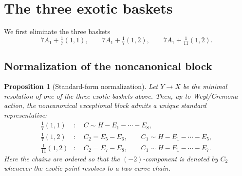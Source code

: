 \documentclass[11pt]{article}
\newtheorem{proposition}[proposition]{Proposition}
\theoremstyle{definition}
\begin{document}
\section{The three exotic baskets}\label{sec:exotic}
We first eliminate the three baskets
\[
7A_1+\tfrac17(1,1),\qquad 7A_1+\tfrac17(1,2),\qquad 7A_1+\tfrac1{11}(1,2).
\]

\subsection{Normalization of the noncanonical block}

\begin{proposition}[Standard-form normalization]\label{prop:exotic-normalization}
Let $Y\to X$ be the minimal resolution of one of the three exotic baskets above. Then, up to Weyl/Cremona action, the noncanonical exceptional block admits a unique standard representative:
\begin{align*}
\tfrac17(1,1) &:\quad C\sim H-E_1-\cdots-E_8,\\
\tfrac17(1,2) &:\quad C_2=E_5-E_6,\qquad C_1\sim H-E_1-\cdots-E_5,\\
\tfrac1{11}(1,2) &:\quad C_2=E_7-E_8,\qquad C_1\sim H-E_1-\cdots-E_7.
\end{align*}
Here the chains are ordered so that the $(-2)$-component is denoted by $C_2$ whenever the exotic point resolves to a two-curve chain.
\end{proposition}
\end{document}
